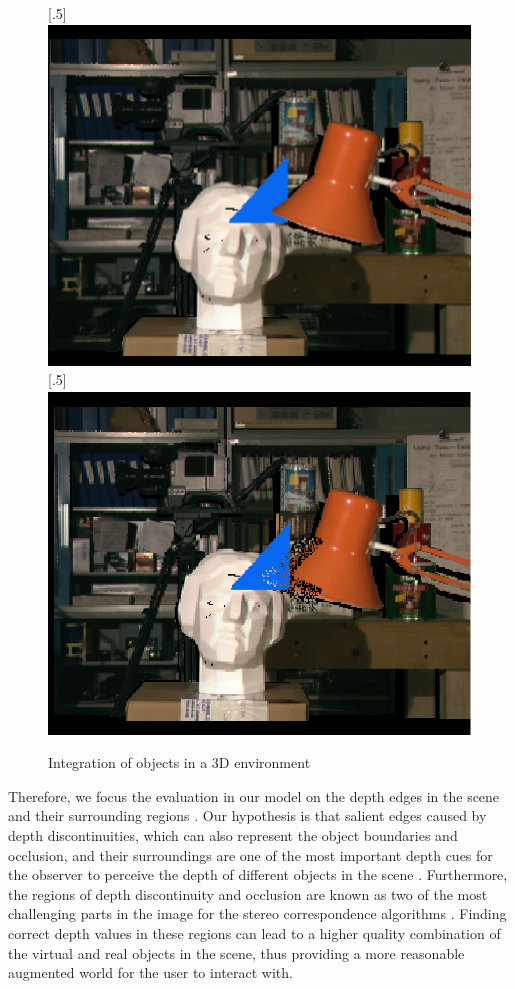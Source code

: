 \begin{figure}[H]
\centering
{}
[.5\linewidth]{\includegraphics[scale=0.7]{tsukuba}}%
[.5\linewidth]{\includegraphics[scale=0.7]{tsukubadist}}%
\caption{Integration of objects in a 3D environment}
\label{fig:ARreg}
\end{figure}

Therefore, we focus the evaluation in our model
on the depth edges in the scene and their surrounding regions \cite{liv05,kru10}.
Our hypothesis is that salient edges caused by depth discontinuities, which can also represent the object boundaries and occlusion, and their surroundings
are one of the most important depth cues for the observer 
to perceive the depth of different objects in the scene \cite{sze11}. 
Furthermore, the regions of depth discontinuity and occlusion are known as two of the most challenging parts in the image
for the stereo correspondence algorithms \cite{sch02}.
Finding correct depth values in these 
regions can lead to a higher quality combination of the virtual and real objects in the scene, thus providing a more reasonable augmented world 
for the user to interact with.


